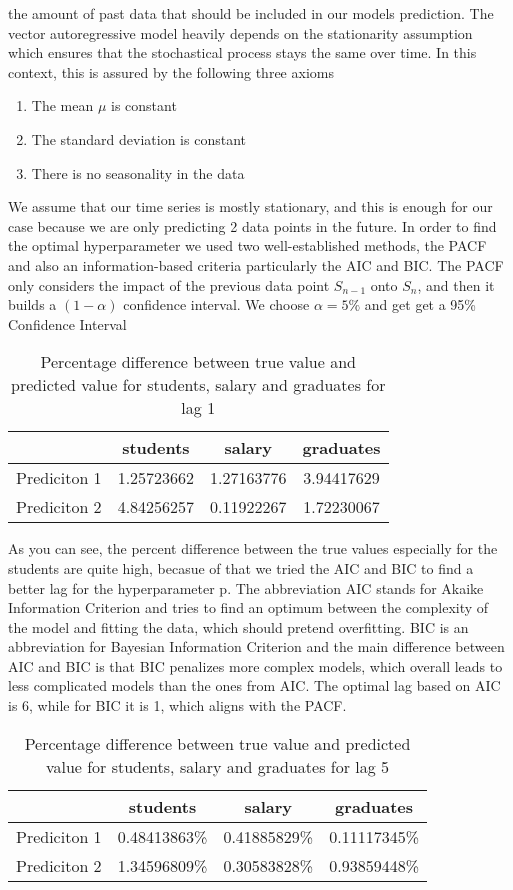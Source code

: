 \documentclass{article}
\theoremstyle{plain}
\theoremstyle{definition}
\theoremstyle{remark}
\begin{document}
the amount of past data that should be included in our models prediction. 
The vector autoregressive model heavily depends on the stationarity assumption which ensures that the stochastical process stays the same over time. 
In this context, this is assured by the following three axioms
\begin{enumerate}[label=\Roman*]
    \item The mean $\mu$ is constant
    \item The standard deviation is constant
    \item There is no seasonality in the data
\end{enumerate}
We assume that our time series is mostly stationary, and this is enough for our case because we are only predicting 2 data points in the future.
In order to find the optimal hyperparameter we used two well-established methods, the PACF and also an information-based criteria particularly the AIC and 
BIC. The PACF only considers the impact of the previous data point $S_{n-1}$ onto $S_{n}$, and then it builds a $(1-\alpha)$ confidence interval. We choose $\alpha = 5\%$ and get
get a 95\% Confidence Interval 
\begin{table}[H]
    \centering
    \begin{tabular}{c|c|c|c}
        & students & salary & graduates \\
        \hline
        Prediciton 1 & 1.25723662 & 1.27163776 & 3.94417629 \\
        \hline
        Prediciton 2 & 4.84256257 & 0.11922267 & 1.72230067
    \end{tabular}
    \caption{Percentage difference between true value and predicted value for students, salary and graduates for lag 1}
\end{table}
As you can see, the percent difference between the true values especially for the students are quite high, becasue of that we tried the AIC and BIC to find a better lag for the 
hyperparameter p.  The abbreviation AIC stands for Akaike Information Criterion and tries to find an optimum between the complexity of the model and fitting the data, which should pretend overfitting. 
BIC is an abbreviation for Bayesian Information Criterion and the main difference between AIC and BIC is that BIC penalizes more complex models, which overall leads to less complicated models than the ones from AIC.
The optimal lag based on AIC is 6, while for BIC it is 1, which aligns with the PACF.
\begin{table}[H]
    \centering
    \begin{tabular}{c|c|c|c}
        & students & salary & graduates \\
        \hline
        Prediciton 1 & 0.48413863\% & 0.41885829\% & 0.11117345\% \\
        \hline
        Prediciton 2 & 1.34596809\% & 0.30583828\% & 0.93859448\%
    \end{tabular}
    \caption{Percentage difference between true value and predicted value for students, salary and graduates for lag 5}
\end{table}
\end{document}
